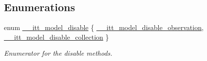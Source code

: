 \subsection*{Enumerations}
\begin{DoxyCompactItemize}
\item 
enum \hyperlink{group__model_ga1202045d9271afd9f59f323a9fe30622}{\-\_\-\-\_\-itt\-\_\-model\-\_\-disable} \{ \hyperlink{group__model_gga1202045d9271afd9f59f323a9fe30622ae19da767acb4729533faae718e8e9870}{\-\_\-\-\_\-itt\-\_\-model\-\_\-disable\-\_\-observation}, 
\hyperlink{group__model_gga1202045d9271afd9f59f323a9fe30622a8ab0c396253ed1856674e07b6b706b1a}{\-\_\-\-\_\-itt\-\_\-model\-\_\-disable\-\_\-collection}
 \}
\begin{DoxyCompactList}\small\item\em Enumerator for the disable methods. \end{DoxyCompactList}\end{DoxyCompactItemize}
